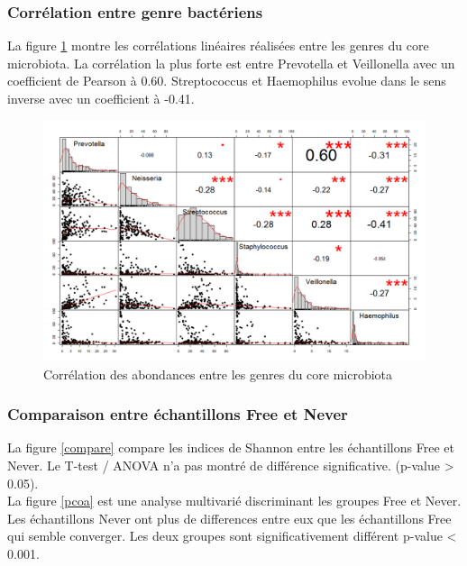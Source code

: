 \documentclass[12pt,a4paper]{article}
\begin{document}
\subsubsection{Corrélation entre genre bactériens}
La figure \ref{correlation} montre les corrélations linéaires réalisées entre les genres du core microbiota. La corrélation la plus forte est entre Prevotella et Veillonella avec un coefficient de Pearson à 0.60.  Streptococcus et Haemophilus evolue dans le sens inverse avec un coefficient à -0.41. 
 

\begin{figure}
\begin{center}
\includegraphics[scale=0.50]{img/small_correlation.png}\hfill
\end{center}
\caption{Corrélation des abondances entre les genres du core microbiota}
\label{correlation}
\end{figure}

\subsubsection{Comparaison entre échantillons Free et Never}
La figure \ref{compare} compare les indices de Shannon entre les échantillons Free et Never. Le T-test / ANOVA n'a pas montré de différence significative. (p-value > 0.05). \\
La figure  \ref{pcoa} est une analyse multivarié discriminant les groupes Free et Never. Les échantillons Never ont plus de differences entre eux que les échantillons Free qui semble converger.  Les deux groupes sont significativement différent p-value < 0.001.
\end{document}
